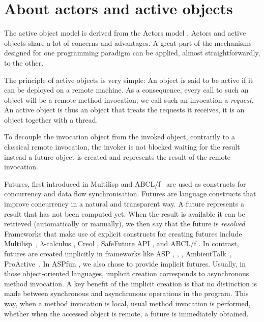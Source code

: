\section{About actors and active objects}
The active object model is  derived from the Actors
model \cite{DBLP:conf/birthday/AghaT04,agha97foundation,Agha86-book}. Actors and active objects share
a lot of concerns and advantages. A great part of the mechanisms
designed for one programming paradigm can be applied, almost
straightforwardly, to the other.


The principle of active objects is very simple: An object is said to be
active if it can be deployed on a remote machine. As a consequence,
every call to such an object will be a remote method invocation; we
call such an invocation a \emph{request}. An active object is thus an
object that treats the requests it receives, it is an object together
with a thread.

To decouple the invocation object from the invoked object, contrarily
to a classical remote invocation, the invoker is not blocked waiting
for the result instead a future object is created and represents the
result of the remote invocation.

Futures, first introduced in Multilisp \cite{Halstead85} and ABCL/f~\cite{ABCL1994}
are used as constructs for concurrency and data
flow synchronisation. Futures are language constructs that improve
concurrency in a natural and transparent way. A future represents a
result that has not been computed yet. When the result is available it
can be retrieved (automatically or manually), we then say that the
future is \emph{resolved}.
Frameworks that make use
of explicit constructs for creating futures include
Multilisp~\cite{Halstead85}, $\lambda$-calculus \cite{jlambda-fut06}, Creol
\cite{Elinar2006}, SafeFuture API \cite{SafeFutures05}, and ABCL/f
\cite{ABCL1994}. In contrast, futures are created implicitly in
frameworks like  ASP \cite{CHS-IC2008}, \cite{CHSPOPL04},
\cite{CH-book},
AmbientTalk~\cite{DedeckerCMDM-ecoop06},
ProActive~\cite{CDD:CMST06}. In  ASPfun \cite{HKL:SCP11},
\cite{HK:FOCLASA09} we also chose to provide implicit
futures. Usually, in those object-oriented languages,
implicit creation corresponds to asynchronous method invocation. A key
benefit of the implicit creation is that no distinction is made
between synchronous and asynchronous operations in the program.
This way, when a method invocation is local, usual method invocation
is performed, whether when the accessed object is remote, a future is
immediately obtained.

